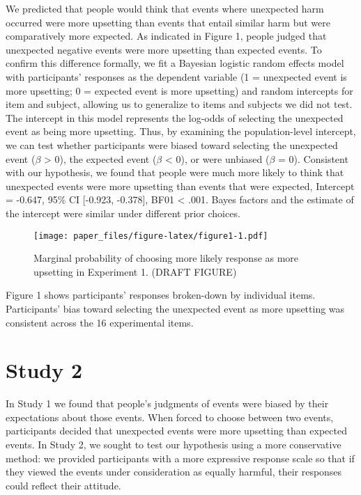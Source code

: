 \documentclass[12pt,]{article}
\begin{document}
We predicted that people would think that events where unexpected harm
occurred were more upsetting than events that entail similar harm but
were comparatively more expected. As indicated in Figure 1, people
judged that unexpected negative events were more upsetting than expected
events. To confirm this difference formally, we fit a Bayesian logistic
random effects model with participants' responses as the dependent
variable (1 = unexpected event is more upsetting; 0 = expected event is
more upsetting) and random intercepts for item and subject, allowing us
to generalize to items and subjects we did not test. The intercept in
this model represents the log-odds of selecting the unexpected event as
being more upsetting. Thus, by examining the population-level intercept,
we can test whether participants were biased toward selecting the
unexpected event (\(\beta\) \textgreater{} 0), the expected event
(\(\beta\) \textless{} 0), or were unbiased (\(\beta\) = 0). Consistent
with our hypothesis, we found that people were much more likely to think
that unexpected events were more upsetting than events that were
expected, Intercept = -0.647, 95\% CI {[}-0.923, -0.378{]}, BF01
\textless{} .001. Bayes factors and the estimate of the intercept were
similar under different prior choices.

\begin{figure}
\centering
\texttt{[image: paper\_files/figure-latex/figure1-1.pdf]}
\caption{Marginal probability of choosing more likely response as more
upsetting in Experiment 1. (DRAFT FIGURE)}
\end{figure}

Figure 1 shows participants' responses broken-down by individual items.
Participants' bias toward selecting the unexpected event as more
upsetting was consistent across the 16 experimental items.

\section{Study 2}\label{study-2}

In Study 1 we found that people's judgments of events were biased by
their expectations about those events. When forced to choose between two
events, participants decided that unexpected events were more upsetting
than expected events. In Study 2, we sought to test our hypothesis using
a more conservative method: we provided participants with a more
expressive response scale so that if they viewed the events under
consideration as equally harmful, their responses could reflect their
attitude.
\end{document}
